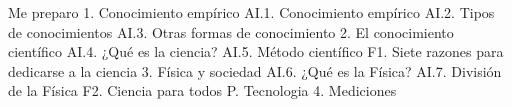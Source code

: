Me preparo
1.	Conocimiento empírico
AI.1.	Conocimiento empírico
AI.2.	Tipos de conocimientos
AI.3.	Otras formas de conocimiento
2.	El conocimiento científico
AI.4.	¿Qué es la ciencia?
AI.5.	Método científico
F1.	Siete razones para dedicarse a la ciencia
3.	Física y sociedad
AI.6.	¿Qué es la Física?
AI.7.	División de la Física
F2.	Ciencia para todos
P.	Tecnologia
4.	Mediciones